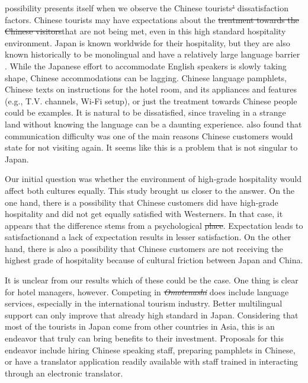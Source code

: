 \documentclass[smallextended,natbib]{svjour3}       %
\providecommand{\DIFadd}[1]{{\protect\color{blue}\uwave{#1}}} %
\providecommand{\DIFdel}[1]{{\protect\color{red}\sout{#1}}}                      %
\providecommand{\DIFaddbegin}{} %
\providecommand{\DIFaddend}{} %
\providecommand{\DIFdelbegin}{} %
\providecommand{\DIFdelend}{} %
\begin{document}
    \DIFadd{Another }\DIFaddend possibility presents itself when we observe the Chinese tourists\DIFdelbegin \DIFdel{' }\DIFdelend \DIFaddbegin \DIFadd{’ }\DIFaddend dissatisfaction factors. Chinese tourists may have expectations about the \DIFdelbegin \DIFdel{treatment towards the Chinese visitors}\DIFdelend \DIFaddbegin \DIFadd{Chinese visitors' treatment }\DIFaddend that are not being met, even in this high standard hospitality environment. Japan is known worldwide for their hospitality, but they are also known historically to be monolingual and have a relatively large language barrier \DIFdelbegin %
\DIFdelend \DIFaddbegin \cite[][]{heinrich2012making,coulmas2002japan}\DIFaddend . While the Japanese effort to accommodate English speakers is slowly taking shape, Chinese accommodations can be lagging. Chinese language pamphlets, Chinese texts on instructions for the hotel room, and its appliances and features (e.g., T.V. channels, Wi-Fi setup), or just the treatment towards Chinese people could be examples. It is natural to be dissatisfied, since traveling in a strange land without knowing the language can be a daunting experience. \cite{ryan2001} also found that communication difficulty was one of the main reasons Chinese customers would state for not visiting again. It seems like this is a problem that is not singular to Japan.

    Our initial question was whether the environment of high-grade hospitality would affect both cultures equally. This study brought us closer to the answer. On the one hand, there is a possibility that Chinese customers did have high-grade hospitality and did not get equally satisfied with Westerners. In that case, it appears that the difference stems from a psychological \DIFdelbegin \DIFdel{place}\DIFdelend \DIFaddbegin \DIFadd{source}\DIFaddend . Expectation leads to satisfaction\DIFaddbegin \DIFadd{, }\DIFaddend and a lack of expectation results in lesser satisfaction. On the other hand, there is also a possibility that Chinese customers are not receiving the highest grade of hospitality because of cultural friction between Japan and China.

    It is unclear from our results which of these could be the case. One thing is clear for hotel managers, however. Competing in \textit{\DIFdelbegin \DIFdel{Omotenashi}\DIFdelend \DIFaddbegin \DIFadd{omotenashi}\DIFaddend } does include language services, especially in the international tourism industry. Better multilingual support can only improve that already high standard in Japan. Considering that most of the tourists in Japan come from other countries in Asia, this is an endeavor that truly can bring benefits to their investment. Proposals for this endeavor include hiring Chinese speaking staff, preparing pamphlets in Chinese, or have a translator application readily available with staff trained in interacting through an electronic translator.
\end{document}
